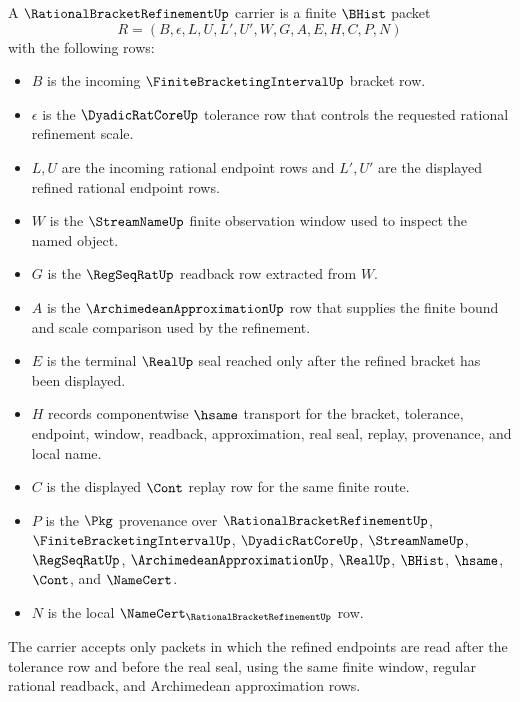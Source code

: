 \begin{definition}
\label{def:rational-bracket-refinement-carrier}
A $\RationalBracketRefinementUp$ carrier is a finite $\BHist$ packet
$$
R=(B,\epsilon,L,U,L',U',W,G,A,E,H,C,P,N)
$$
with the following rows:
\begin{itemize}
\item $B$ is the incoming $\FiniteBracketingIntervalUp$ bracket row.
\item $\epsilon$ is the $\DyadicRatCoreUp$ tolerance row that controls the requested rational refinement scale.
\item $L,U$ are the incoming rational endpoint rows and $L',U'$ are the displayed refined rational endpoint rows.
\item $W$ is the $\StreamNameUp$ finite observation window used to inspect the named object.
\item $G$ is the $\RegSeqRatUp$ readback row extracted from $W$.
\item $A$ is the $\ArchimedeanApproximationUp$ row that supplies the finite bound and scale comparison used by the refinement.
\item $E$ is the terminal $\RealUp$ seal reached only after the refined bracket has been displayed.
\item $H$ records componentwise $\hsame$ transport for the bracket, tolerance, endpoint, window, readback, approximation, real seal, replay, provenance, and local name.
\item $C$ is the displayed $\Cont$ replay row for the same finite route.
\item $P$ is the $\Pkg$ provenance over $\RationalBracketRefinementUp$, $\FiniteBracketingIntervalUp$, $\DyadicRatCoreUp$, $\StreamNameUp$, $\RegSeqRatUp$, $\ArchimedeanApproximationUp$, $\RealUp$, $\BHist$, $\hsame$, $\Cont$, and $\NameCert$.
\item $N$ is the local $\NameCert_{\RationalBracketRefinementUp}$ row.
\end{itemize}
The carrier accepts only packets in which the refined endpoints are read after the tolerance row and before the real seal, using the same finite window, regular rational readback, and Archimedean approximation rows.
\end{definition}

